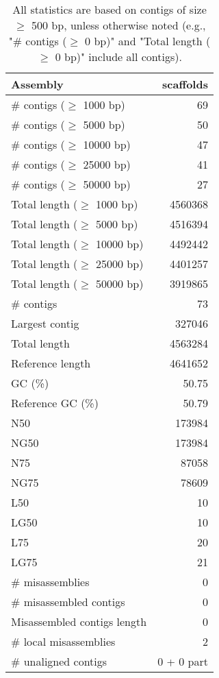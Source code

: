 \documentclass[12pt,a4paper]{article}
\begin{document}
\begin{table}[ht]
\begin{center}
\caption{All statistics are based on contigs of size $\geq$ 500 bp, unless otherwise noted (e.g., "\# contigs ($\geq$ 0 bp)" and "Total length ($\geq$ 0 bp)" include all contigs).}
\begin{tabular}{|l*{1}{|r}|}
\hline
Assembly & scaffolds \\ \hline
\# contigs ($\geq$ 1000 bp) & 69 \\ \hline
\# contigs ($\geq$ 5000 bp) & 50 \\ \hline
\# contigs ($\geq$ 10000 bp) & 47 \\ \hline
\# contigs ($\geq$ 25000 bp) & 41 \\ \hline
\# contigs ($\geq$ 50000 bp) & 27 \\ \hline
Total length ($\geq$ 1000 bp) & 4560368 \\ \hline
Total length ($\geq$ 5000 bp) & 4516394 \\ \hline
Total length ($\geq$ 10000 bp) & 4492442 \\ \hline
Total length ($\geq$ 25000 bp) & 4401257 \\ \hline
Total length ($\geq$ 50000 bp) & 3919865 \\ \hline
\# contigs & 73 \\ \hline
Largest contig & 327046 \\ \hline
Total length & 4563284 \\ \hline
Reference length & 4641652 \\ \hline
GC (\%) & 50.75 \\ \hline
Reference GC (\%) & 50.79 \\ \hline
N50 & 173984 \\ \hline
NG50 & 173984 \\ \hline
N75 & 87058 \\ \hline
NG75 & 78609 \\ \hline
L50 & 10 \\ \hline
LG50 & 10 \\ \hline
L75 & 20 \\ \hline
LG75 & 21 \\ \hline
\# misassemblies & 0 \\ \hline
\# misassembled contigs & 0 \\ \hline
Misassembled contigs length & 0 \\ \hline
\# local misassemblies & 2 \\ \hline
\# unaligned contigs & 0 + 0 part \\ \hline

\end{tabular}
\end{center}
\end{table}
\end{document}
